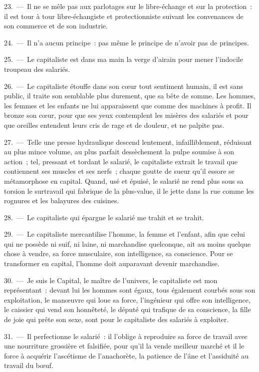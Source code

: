 \documentclass[french,twoside]{book} %
\begin{document}
23. — Il ne se mêle pas aux parlotages sur le libre-échange et sur la protection : il est tour à tour libre-échangiste et protectionniste suivant les convenances de son commerce et de son industrie.\par
24. — Il n’a aucun principe : pas même le principe de n’avoir pas de principes.\par
25. — Le capitaliste est dans ma main la verge d’airain pour mener l’indocile troupeau des salariés.\par
26. — Le capitaliste étouffe dans son cœur tout sentiment humain, il est sans public, il traite son semblable plus durement, que sa bête de somme. Les hommes, les femmes et les enfants ne lui apparaissent que comme des machines à profit. Il bronze son cœur, pour que ses yeux contemplent les misères des salariés et pour que oreilles entendent leurs cris de rage et de douleur, et ne palpite pas.\par
27. — Telle une presse hydraulique descend lentement, infailliblement, réduisant au plus mince volume, au plus parfait dessèchement la pulpe soumise à son action ; tel, pressant et tordant le salarié, le capitaliste extrait le travail que contiennent ses muscles et ses nerfs ; chaque goutte de sueur qu’il essore se métamorphose en capital. Quand, usé et épuisé, le salarié ne rend plus sous sa torsion le surtravail qui fabrique de la plus-value, il le jette dans la rue comme les rognures et les balayures des cuisines.\par
28. — Le capitaliste qui épargne le salarié me trahit et se trahit.\par
29. — Le capitaliste mercantilise l’homme, la femme et l’enfant, afin que celui qui ne possède ni suif, ni laine, ni marchandise quelconque, ait au moins quelque chose à vendre, sa force musculaire, son intelligence, sa conscience. Pour se transformer en capital, l’homme doit auparavant devenir marchandise.\par
30. — Je suis le Capital, le maître de l’univers, le capitaliste est mon représentant : devant lui les hommes sont égaux, tous également courbés sous son exploitation, le manœuvre qui loue sa force, l’ingénieur qui offre son intelligence, le caissier qui vend son honnêteté, le député qui trafique de sa conscience, la fille de joie qui prête son sexe, sont pour le capitaliste des salariés à exploiter.\par
31. — Il perfectionne le salarié : il l’oblige à reproduire sa force de travail avec une nourriture grossière et falsifiée, pour qu’il la vende meilleur marché et il le force à acquérir l’ascétisme de l’anachorète, la patience de l’âne et l’assiduité au travail du bœuf.\par
\end{document}
